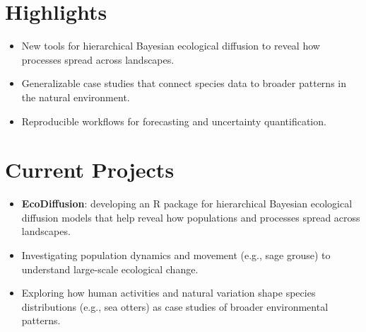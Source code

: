 \section*{Highlights}
\begin{itemize}
  \item New tools for hierarchical Bayesian ecological diffusion to reveal how processes spread across landscapes.
  \item Generalizable case studies that connect species data to broader patterns in the natural environment.
  \item Reproducible workflows for forecasting and uncertainty quantification.
\end{itemize}

\section*{Current Projects}
\begin{itemize}
  \item \textbf{EcoDiffusion}: developing an R package for hierarchical Bayesian ecological diffusion models that help reveal how populations and processes spread across landscapes.
  \item Investigating population dynamics and movement (e.g., sage grouse) to understand large-scale ecological change.
  \item Exploring how human activities and natural variation shape species distributions (e.g., sea otters) as case studies of broader environmental patterns.
\end{itemize}
